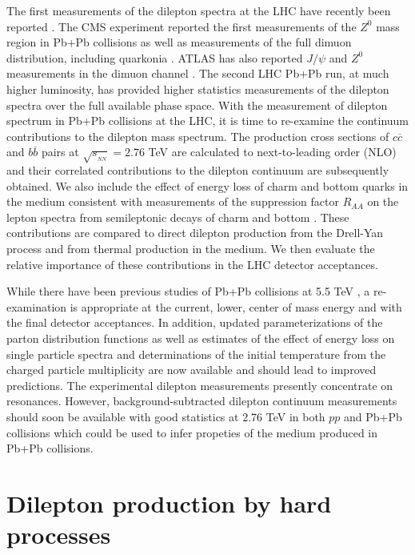  The first measurements of the dilepton spectra at the LHC have recently been 
reported \cite{zboson,CMSQ,ATLASJ}. The CMS experiment reported the first 
measurements of the $Z^0$ mass region in Pb+Pb collisions \cite{zboson} as
well as measurements of the full dimuon distribution, including quarkonia 
\cite{CMSQ}.  ATLAS has also reported $J/\psi$ and $Z^0$  measurements in the
dimuon channel \cite{ATLASJ}.  The second LHC Pb+Pb run, 
at much higher luminosity, has provided higher statistics measurements of the
dilepton spectra over the full available phase space.  With the measurement of
dilepton spectrum in Pb+Pb collisions at the LHC, it is time to re-examine the 
continuum contributions to the dilepton mass spectrum.  The production cross 
sections of $c \overline c$ and $b \overline b$ pairs at 
$\sqrt{s_{_{NN}}} = 2.76$ TeV are calculated to next-to-leading order (NLO) 
and their correlated contributions to the dilepton continuum are subsequently 
obtained. We also include the effect of energy
loss of charm and bottom quarks in the medium consistent with measurements of 
the suppression factor $R_{AA}$ on the lepton spectra from semileptonic
decays of charm and bottom \cite{RAARHIC,RAAAlice}. These contributions are
compared to direct dilepton production from the Drell-Yan process and from
thermal production in the medium.  We then evaluate the relative importance of
these contributions in the LHC detector acceptances.

While there have been previous studies of Pb+Pb collisions at 5.5 TeV 
\cite{GAVIN,LIN2,GALL}, a re-examination is appropriate at the current, lower, 
center of mass energy and with the final detector acceptances.  In addition, 
updated parameterizations of the parton distribution functions as well as
estimates of the effect of energy loss on single particle spectra
and determinations of the initial temperature from the charged particle
multiplicity are now available and should lead to improved predictions. The
experimental dilepton measurements presently concentrate on
resonances.  However, background-subtracted dilepton continuum measurements
should soon be available with good statistics at 2.76 TeV in both $pp$ and 
Pb+Pb collisions which could be used to infer propeties of the medium 
produced in Pb+Pb collisions.


\section{Dilepton production by hard processes}
\label{harddilep}

